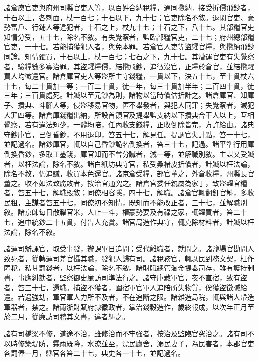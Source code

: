 \begin{pinyinscope}
 諸倉庾官吏與府州司縣官吏人等，以百姓合納稅糧，通同攬納，接受折價飛鈔者，十石以上，各刺面，杖一百七；十石以下，九十七；官吏除名不敘。退閑官吏、豪勢富戶、行鋪人等違犯者，十石之上，杖九十七；十石之下，八十七。其部糧官吏知情分受，五十七，除名不敘。有失覺察者，監臨部糧官吏，二十七；府州總部糧官吏，一十七。若能捕獲犯人者，與免本罪。若倉官人吏等盜糶官糧，與攬納飛鈔同論。知情糴買，十石以上，杖一百七；七石之下，九十七。其漕運官吏有失覺察者，驗糧數多寡治罪。其盜糶糧價，結攬飛鈔，追徵沒官，正糧於倉官，並結攬糴買人均徵還官。諸倉庫官吏人等盜所主守錢糧，一貫以下，決五十七，至十貫杖六十七，每二十貫加一等；一百二十貫，徒一年，每三十貫加半年；二百四十貫，徒三年；三百貫處死。計贓以至元鈔為則，諸物以當時價估折計之。諸倉庫官、知庫子、攢典、斗腳人等，侵盜移易官物，匿不舉發者，與犯人同罪；失覺察者，減犯人罪四等。諸倉庫錢糧出納，所設首領官及提舉監支納以下攢典合干人以上，互相覺察，若有違法短少，一體均陪，任內收支錢糧，正收倒除皆完，方許給由。諸典守鈔庫官，已倒昏鈔，不用退印，笞五十七，解見任。提調官失計點，笞一十七，並記過名。諸鈔庫官，輒以自己昏鈔詭名倒換者，笞三十七，記過。諸平準行用庫倒換昏鈔，多取工墨錢，庫官知而不曾分贓者，減一等，並解職別敘。主謀又受贓者，以枉法論，除名不敘。諸白紙坊典守官，私受桑楮皮折價者，計贓以枉法論，除名不敘，仍追贓，收買本色還官。諸京倉受糧，部官董之，外倉收糧，州縣長官董之。收不如法致腐敗者，按治官通究之。諸倉官委任親屬為家丁，致盜糶官糧者，笞五十七，解職殿敘；同僚相容隱，四十七，解職。諸倉官輒翻釘官斛，多收民租，主謀者笞五十七，同僚初不知情，既知而不能改正者，三十七，並解職別敘。諸京師每日散糶官米，人止一斗，權豪勢要及有祿之家，輒糴買者，笞二十七，追中統鈔二十五貫，付告人充賞。諸官局造作典守，輒克除材料者，計贓以枉法論，除名不敘。



 諸運司辦課官，取受事發，辦課畢日追問；受代離職者，就問之。諸鹽場官勘問人致死者，從轉運司差官攝其職，發犯人歸有司。諸稅務官，輒以民到務文契，枉作匿稅，私其罰錢者，以枉法論，除名不敘。諸財賦總管淘金提舉司存，雖有護持制書，事應糾劾者，監察御史廉訪司準法行之。諸守庫藏軍官，夜不直宿，致有盜者，笞三十七，還職。捕盜不獲者，圍宿軍官軍人追陪所失物貨，俟獲盜徵贓給還。若遇強劫，軍官軍人力所不及者，不在追斷之限。諸雜造局院，輒與諸人帶造軍器者，禁之。諸兩浙財賦府隸徽政者，掌治錢穀造作，歲終報成，以次年正月至於二月，從廉訪司稽其文書，違者糾之。



 諸有司橋梁不修，道途不治，雖修治而不牢強者，按治及監臨官究治之。諸有司不以時修築堤防，霖雨既降，水潦並至，漂民廬舍，溺民妻子，為民害者，本郡官吏各罰俸一月，縣官各笞二十七，典史各一十七，並記過名。




\end{pinyinscope}
